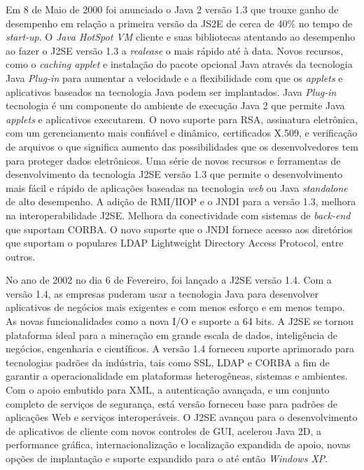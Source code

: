 Em 8 de Maio de 2000 foi anunciado o Java 2 versão 1.3 que trouxe ganho de desempenho em relação a primeira versão da JS2E de cerca de 40\%  no tempo de {\it  start-up}. O {\it Java HotSpot VM} cliente e suas bibliotecas atentando ao desempenho ao fazer o J2SE versão 1.3 a {\it realease} o mais rápido até à data. Novos recursos, como o {\it caching applet} e instalação do pacote opcional Java através da tecnologia Java {\it  Plug-in} para aumentar a velocidade e a flexibilidade com que os {\it applets} e aplicativos baseados na tecnologia Java podem ser implantados. Java {\it  Plug-in} tecnologia é um componente do ambiente de execução Java 2 que permite Java {\it applets} e aplicativos executarem. O novo suporte para \acs{RSA}, assinatura eletrônica, com um gerenciamento mais confiável e dinâmico, certificados X.509, e verificação de arquivos o que significa aumento das possibilidades que os desenvolvedores tem para proteger dados eletrônicos. Uma série de novos recursos e ferramentas de desenvolvimento da tecnologia J2SE versão 1.3 que permite o desenvolvimento mais fácil e rápido de aplicações baseadas na tecnologia {\it web} ou Java {\it  standalone} de alto desempenho. A adição de RMI/IIOP e o JNDI para a versão 1.3, melhora na interoperabilidade J2SE. Melhora da conectividade com sistemas de {\it  back-end} que suportam CORBA. O novo suporte que o JNDI fornece acesso aos diretórios que suportam o populares LDAP Lightweight Directory Access Protocol, entre outros.


No ano de 2002 no dia 6 de Fevereiro, foi lançado a J2SE versão 1.4. Com a versão 1.4, as empresas puderam usar a tecnologia Java para desenvolver aplicativos de negócios mais exigentes e com menos esforço e em menos tempo. As novas funcionalidades como a nova I/O e suporte a 64 bits. A J2SE se tornou plataforma ideal para a mineração em grande escala de dados, inteligência de negócios, engenharia e científicos. A versão 1.4 forneceu suporte aprimorado para tecnologias padrões da indústria, tais como SSL, LDAP e CORBA a fim de garantir a operacionalidade em plataformas heterogêneas, sistemas e ambientes. Com o apoio embutido para XML, a autenticação avançada, e um conjunto completo de serviços de segurança, está versão forneceu base para padrões de aplicações Web e serviços interoperáveis. O J2SE avançou para o desenvolvimento de aplicativos de cliente com novos controles de GUI, acelerou Java 2D, a performance gráfica, internacionalização e localização expandida de apoio, novas opções de implantação e suporte expandido para o até então {\it Windows XP}.

